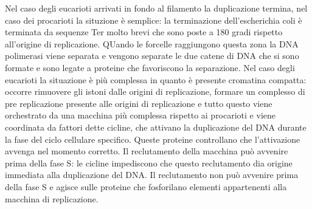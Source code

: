 Nel caso degli eucarioti arrivati in fondo al filamento la duplicazione termina, nel caso dei procarioti la situzione \`e semplice: la terminazione  dell'escherichia coli \` e terminata
da sequenze Ter molto brevi che sono poste a 180 gradi rispetto all'origine di replicazione. QUando le forcelle raggiungono questa zona la DNA polimerasi viene separata e vengono  
separate le due catene di DNA che si sono formate e sono legate a proteine che favoriscono la separazione. Nel caso degli eucarioti la situazione \`e pi\`u complessa in quanto \`e 
presente cromatina compatta: occorre rimuovere gli istoni dalle origini di replicazione, formare un complesso di pre replicazione presente alle origini di replicazione e tutto questo 
viene orchestrato da una macchina pi\`u complessa rispetto ai procarioti e viene coordinata da fattori dette cicline, che attivano la duplicazione del DNA durante la fase del ciclo 
cellulare specifico. Queste proteine controllano che l'attivazione avvenga nel momento corretto. Il reclutamento della macchina pu\`o avvenire prima della fase S: le cicline impediscono
che questo reclutamento dia origine immediata alla duplicazione del DNA. Il reclutamento non pu\`o avvenire prima della fase S e agisce sulle proteine che fosforilano elementi 
appartenenti alla macchina di replicazione. 
